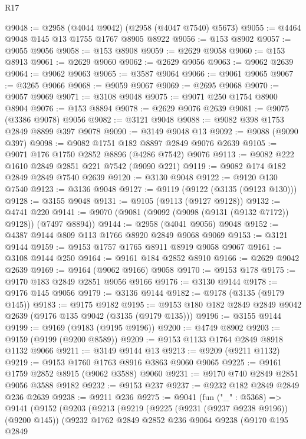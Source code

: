 \begin{lexlean}{R17}
\begin{coremodule}
@9048 := @2958 (@4044 @9042) (@2958 (@4047 @7540) @5673)
@9055 := @4464 @9048 @145 @13 @1755 @1767 @8905 @8922
@9056 := @153 @8902
@9057 := @9055 @9056
@9058 := @153 @8908
@9059 := @2629 @9058
@9060 := @153 @8913
@9061 := @2629 @9060
@9062 := @2629 @9056
@9063 := @9062 @2639
@9064 := @9062 @9063
@9065 := @3587 @9064
@9066 := @9061 @9065
@9067 := @3265 @9066
@9068 := @9059 @9067
@9069 := @2695 @9068
@9070 := @9057 @9069
@9071 := @3108 @9048
@9075 := @9071 @250 @1754 @8900 @8904
@9076 := @153 @8894
@9078 := @2629 @9076 @2639
@9081 := @9075 (@3386 @9078) @9056
@9082 := @3121 @9048
@9088 := @9082 @398 @1753 @2849 @8899 @397 @9078
@9090 := @3149 @9048 @13
@9092 := @9088 (@9090 @397)
@9098 := @9082 @1751 @182 @8897 @2849 @9076 @2639
@9105 := @9071 @176 @1750 @2852 @8896 (@4286 @7542) @9076
@9113 := @9082 @222 @1610 @2849 @2851 @221 @7542 (@9090 @221)
@9119 := @9082 @174 @182 @2849 @2849 @7540 @2639
@9120 := @3130 @9048
@9122 := @9120 @130 @7540
@9123 := @3136 @9048
@9127 := @9119 (@9122 (@3135 (@9123 @130)))
@9128 := @3155 @9048
@9131 := @9105 (@9113 (@9127 @9128))
@9132 := @4741 @220
@9141 := @9070 (@9081 (@9092 (@9098 (@9131 (@9132 @7172)) @9128)) (@7497 @8894))
@9144 := @2958 (@4041 @9056) @9048
@9152 := @4387 @9144 @809 @113 @1766 @8920 @2849 @9068 @9069
@9153 := @3121 @9144
@9159 := @9153 @1757 @1765 @8911 @8919 @9058 @9067
@9161 := @3108 @9144 @250
@9164 := @9161 @184 @2852 @8910
@9166 := @2629 @9042 @2639
@9169 := @9164 (@9062 @9166) @9058
@9170 := @9153 @178
@9175 := @9170 @183 @2849 @2851 @9056 @9166
@9176 := @3130 @9144
@9178 := @9176 @145 @9056
@9179 := @3136 @9144
@9182 := @9178 (@3135 (@9179 @145))
@9183 := @9175 @9182
@9195 := @9153 @180 @182 @2849 @2849 @9042 @2639 (@9176 @135 @9042 (@3135 (@9179 @135)))
@9196 := @3155 @9144
@9199 := @9169 (@9183 (@9195 @9196))
@9200 := @4749 @8902
@9203 := @9159 (@9199 (@9200 @8589))
@9209 := @9153 @1133 @1764 @2849 @8918 @1132 @9066
@9211 := @3149 @9144 @13
@9213 := @9209 (@9211 @1132)
@9219 := @9153 @1760 @1763 @8916 @3863 @9060 @9065
@9225 := @9161 @1759 @2852 @8915 (@9062 @3588) @9060
@9231 := @9170 @740 @2849 @2851 @9056 @3588 @9182
@9232 := @9153 @237
@9237 := @9232 @182 @2849 @2849 @236 @2639
@9238 := @9211 @236
@9275 := @9041
    (fun ("_" : @5368) =>
    @9141
      (@9152
        (@9203
          (@9213
            (@9219
              (@9225 (@9231 (@9237 @9238 @9196)) (@9200 @145))
              (@9232
                @1762
                @2849
                @2852
                @236
                @9064
                @9238
                (@9170
                  @195
                  @2849

\end{coremodule}
\end{lexlean}
